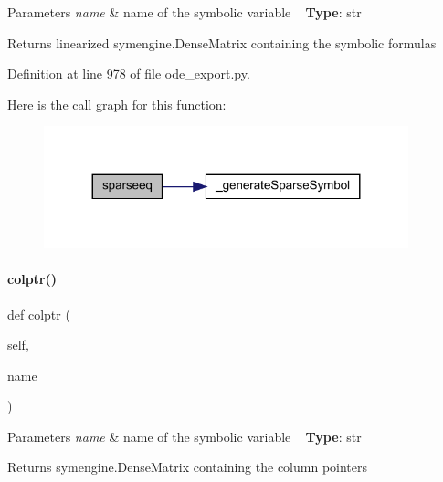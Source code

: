 \begin{DoxyParams}{Parameters}
{\em name} & name of the symbolic variable ~\newline
{\bfseries Type}\+: str\\
\hline
\end{DoxyParams}
\begin{DoxyReturn}{Returns}
linearized symengine.\+Dense\+Matrix containing the symbolic formulas 
\end{DoxyReturn}


Definition at line 978 of file ode\+\_\+export.\+py.

Here is the call graph for this function\+:
\nopagebreak
\begin{figure}[H]
\begin{center}
\leavevmode
\includegraphics[width=299pt]{classamici_1_1ode__export_1_1_o_d_e_model_ade69c458d3c7069f0b062d796f68d1da_cgraph}
\end{center}
\end{figure}
\mbox{\label{classamici_1_1ode__export_1_1_o_d_e_model_ad478875583922ae8d579486a03107557}} 
\paragraph{\texorpdfstring{colptr()}{colptr()}}
{\footnotesize\ttfamily def colptr (\begin{DoxyParamCaption}\item[{}]{self,  }\item[{}]{name }\end{DoxyParamCaption})}


\begin{DoxyParams}{Parameters}
{\em name} & name of the symbolic variable ~\newline
{\bfseries Type}\+: str\\
\hline
\end{DoxyParams}
\begin{DoxyReturn}{Returns}
symengine.\+Dense\+Matrix containing the column pointers 
\end{DoxyReturn}


